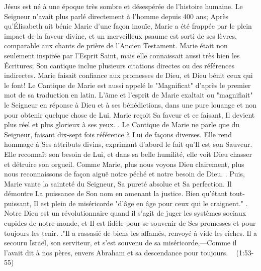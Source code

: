         Jésus est né à une époque très sombre et désespérée de l'histoire humaine. Le Seigneur n'avait plus parlé directement à l'homme depuis 400 ans; Après qu'Élisabeth ait bénie Marie d'une façon inouïe, Marie a été frappée par le plein impact de la faveur divine, et un merveilleux psaume est sorti de ses lèvres, comparable aux chants de prière de l'Ancien Testament. Marie était non seulement inspirée par l'Esprit Saint, mais elle connaissait aussi très bien les Écritures; Son cantique inclue plusieurs citations directes ou des références indirectes. Marie faisait confiance aux promesses de Dieu, et Dieu bénit ceux qui le font!
        Le Cantique de Marie est aussi appelé le "Magnificat" d'après le premier mot de sa traduction en latin. L'âme et l'esprit de Marie exaltait ou "magnifiait" le Seigneur en réponse à Dieu et à ses bénédictions, dans une pure louange et non pour obtenir quelque chose de Lui. Marie reçoit Sa faveur et ce faisant, Il devient plus réel et plus glorieux à ses yeux. . Le Cantique de Marie ne parle que du Seigneur, faisant dix-sept fois référence à Lui de façons diverses. Elle rend hommage à Ses attributs divins, exprimant d'abord le fait qu'Il est son Sauveur. Elle reconnaît son besoin de Lui, et dans sa belle humilité, elle voit Dieu chasser et détruire son orgueil. Comme Marie, plus nous voyons Dieu clairement, plus nous reconnaissons de façon aiguë notre péché et notre besoin de Dieu. . Puis, Marie vante la sainteté du Seigneur, Sa pureté absolue et Sa perfection. Il démontre La puissance de Son nom en amenant la justice. Bien qu'étant tout-puissant, Il est plein de miséricorde "d'âge en âge pour ceux qui le craignent." . Notre Dieu est un révolutionnaire quand il s'agit de juger les systèmes sociaux cupides de notre monde, et Il est fidèle pour se souvenir de Ses promesses et pour toujours les tenir. ."Il a rassasié de biens les affamés, renvoyé à vide les riches. Il a secouru Israël, son serviteur, et s’est souvenu de sa miséricorde,—Comme il l’avait dit à nos pères, envers Abraham et sa descendance pour toujours. ~ (1:53-55) 
              
